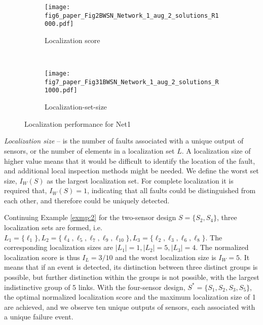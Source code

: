 \documentclass[twocolumn]{autart}
\begin{document}
\begin{figure}
        \centering
        \begin{subfigure}[b]{0.23\textwidth}
               \texttt{[image: fig6\_paper\_Fig2BWSN\_Network\_1\_aug\_2\_solutions\_R1000.pdf]}       
		
		\caption{\footnotesize Localization score}    \label{fig:net1_2} 
        \end{subfigure}
        ~ 
        \begin{subfigure}[b]{0.23\textwidth}
                \texttt{[image: fig7\_paper\_Fig31BWSN\_Network\_1\_aug\_2\_solutions\_R1000.pdf]}        
		\caption{\footnotesize Localization-set-size}   \label{fig:net1_3}  
        \end{subfigure}
       \caption{Localization performance for Net1}  \label{fig:net2_2}
\end{figure}
\vspace{-0.25cm}
\emph{Localization size} -- is the number of faults associated with a unique output of sensors, or the number of elements in a localization set $L$. A localization size of higher value means  that it would be difficult to identify the location of the fault, and additional local inspection methods might be needed. We define the worst set size, $I_W(S)$ as the largest localization set. For complete localization it is required that, $I_W(S)=1$, indicating that all faults could be distinguished from each other, and therefore could be uniquely detected. \vspace{-0.35cm}


\begin{exmp}
Continuing Example \ref{exmp:2} for the two-sensor design $ S= \{S_2,S_4 \}$, three localization sets are formed, i.e. $L_1 =\{ \ell_1 \}, L_2 = \{ \ell_4,\ell_5,\ell_7, \ell_9,\ell_{10}\}, L_3  = \{ \ell_2,\ell_3, \ell_6,\ell_8 \}$. The corresponding localization sizes are $|L_1| = 1, |L_2| = 5, |L_3| = 4$. The normalized localization score is thus $I_L = 3/10$ and the worst localization size is $I_W = 5$. It means that if an event is detected, its distinction between three distinct groups is possible, but further distinction within the groups is not possible, with the largest indistinctive group of 5 links. With the four-sensor design, $ S^*= \{S_1,S_2,S_3,S_5 \}$, the optimal normalized localization score and the maximum localization size of 1 are achieved, and we observe ten unique outputs of sensors, each associated with a unique failure event.
\end{exmp}\vspace{-0.25cm}
\end{document}
